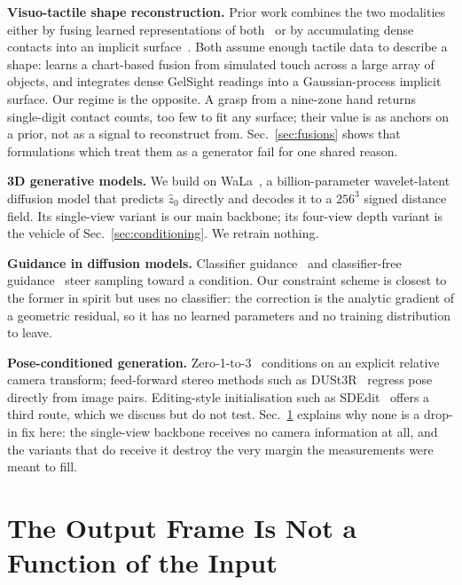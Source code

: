\documentclass[conference]{IEEEtran}
\begin{document}
\textbf{Visuo-tactile shape reconstruction.} Prior work combines the two modalities
either by fusing learned representations of both~\cite{smith2020,smith2021} or by
accumulating dense contacts into an implicit surface~\cite{suresh2022}. Both assume
enough tactile data to describe a shape: \cite{smith2020} learns a chart-based fusion
from simulated touch across a large array of objects, and \cite{suresh2022} integrates
dense GelSight readings into a Gaussian-process implicit surface. Our regime is the
opposite. A grasp from a nine-zone hand returns single-digit contact counts, too few to
fit any surface; their value is as anchors on a prior, not as a signal to reconstruct
from. Sec.~\ref{sec:fusions} shows that formulations which treat them as a generator
fail for one shared reason.

\textbf{3D generative models.} We build on WaLa~\cite{wala}, a billion-parameter
wavelet-latent diffusion model that predicts $\hat{z}_0$ directly and decodes it to a
$256^3$ signed distance field. Its single-view variant is our main backbone; its
four-view depth variant is the vehicle of Sec.~\ref{sec:conditioning}. We retrain
nothing.

\textbf{Guidance in diffusion models.} Classifier guidance~\cite{dhariwal} and
classifier-free guidance~\cite{cfg} steer sampling toward a condition. Our constraint
scheme is closest to the former in spirit but uses no classifier: the correction is the
analytic gradient of a geometric residual, so it has no learned parameters and no
training distribution to leave.

\textbf{Pose-conditioned generation.} Zero-1-to-3~\cite{zero123} conditions on an
explicit relative camera transform; feed-forward stereo methods such as
DUSt3R~\cite{dust3r} regress pose directly from image pairs. Editing-style
initialisation such as SDEdit~\cite{sdedit} offers a third route, which we discuss but
do not test. Sec.~\ref{sec:frame} explains why none is a drop-in fix here: the
single-view backbone receives no camera information at all, and the variants that do
receive it destroy the very margin the measurements were meant to fill.

\section{The Output Frame Is Not a Function of the Input}
\label{sec:frame}
\end{document}
